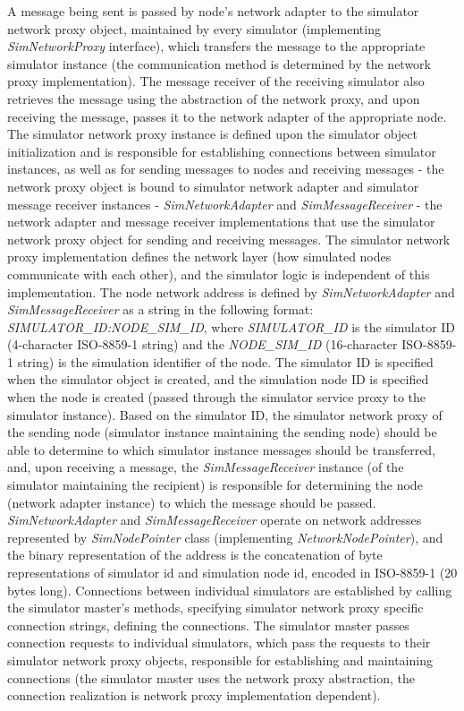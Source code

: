 A message being sent is passed by node's network adapter to the simulator network proxy object, maintained by every simulator (implementing \emph{SimNetworkProxy} interface), which transfers the message to the appropriate simulator instance (the communication method is determined by the network proxy implementation). The message receiver of the receiving simulator also retrieves the message using the abstraction of the network proxy, and upon receiving the message, passes it to the network adapter of the appropriate node. The simulator network proxy instance is defined upon the simulator object initialization and is responsible for establishing connections between simulator instances, as well as for sending messages to nodes and receiving messages - the network proxy object is bound to simulator network adapter and simulator message receiver instances - \emph{SimNetworkAdapter} and \emph{SimMessageReceiver} - the network adapter and message receiver implementations that use the simulator network proxy object for sending and receiving messages. The simulator network proxy implementation defines the network layer (how simulated nodes communicate with each other), and the simulator logic is independent of this implementation. The node network address is defined by \emph{SimNetworkAdapter} and \emph{SimMessageReceiver} as a string in the following format: \emph{SIMULATOR\_ID:NODE\_SIM\_ID}, where \emph{SIMULATOR\_ID} is the simulator ID (4-character ISO-8859-1 string) and the \emph{NODE\_SIM\_ID} (16-character ISO-8859-1 string) is the simulation identifier of the node. The simulator ID is specified when the simulator object is created, and the simulation node ID is specified when the node is created (passed through the simulator service proxy to the simulator instance). Based on the simulator ID, the simulator network proxy of the sending node (simulator instance maintaining the sending node) should be able to determine to which simulator instance messages should be transferred, and, upon receiving a message, the \emph{SimMessageReceiver} instance (of the simulator maintaining the recipient) is responsible for determining the node (network adapter instance) to which the message should be passed. \emph{SimNetworkAdapter} and \emph{SimMessageReceiver} operate on network addresses represented by \emph{SimNodePointer} class (implementing \emph{NetworkNodePointer}), and the binary representation of the address is the concatenation of byte representations of simulator id and simulation node id, encoded in ISO-8859-1 (20 bytes long). Connections between individual simulators are established by calling the simulator master's methods, specifying simulator network proxy specific connection strings, defining the connections. The simulator master passes connection requests to individual simulators, which pass the requests to their simulator network proxy objects, responsible for establishing and maintaining connections (the simulator master uses the network proxy abstraction, the connection realization is network proxy implementation dependent).

